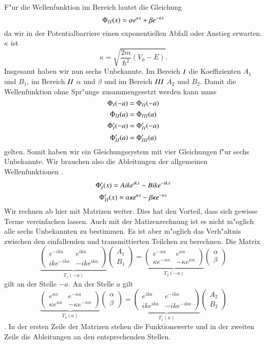 \begin{refsection}
F"ur die Wellenfunktion im Bereich  lautet die Gleichung
\[
\Phi_\RM{2}(x) = \alpha e^{\kappa x} + \beta e^{-\kappa x}
\]
da wir in der Potentialbarriere einen exponentiellen Abfall oder Anstieg erwarten. $\kappa$ ist
\[
\kappa = \sqrt{\frac{2m}{\hbar^2}(V_0 - E)}.
\]
Insgesamt haben wir nun sechs Unbekannte. Im Bereich $\RM{1}$ die Koeffizienten $A_1$ und $B_1$, im Bereich $\RM{2}$ $\alpha$ und $\beta$ und im Bereich $\RM{3}$ $A_2$ und $B_2$. 
Damit die Wellenfunktion ohne Spr"unge zusammengesetzt werden kann muss
\[
\Phi_\RM{1}(-a) = \Phi_\RM{2}(-a)
\]
\[
\Phi_\RM{2}(a) = \Phi_\RM{3}(a)
\]
\[
\Phi_\RM{1}'(-a) = \Phi_\RM{2}'(-a)
\]
\[
\Phi_\RM{2}'(a) = \Phi_\RM{3}'(a)
\]
gelten. Somit haben wir ein Gleichungssystem mit vier Gleichungen f"ur sechs Unbekannte. Wir brauchen also die Ableitungen der allgemeinen Wellenfunktionen .
\[
\Phi_\RM{1}'(x) = Aike^{ikx} - Bike^{-ikx}
\]
\[
\Phi_\RM{2}'(x) = \alpha \kappa e^{\kappa x} - \beta \kappa e^{-\kappa x}
\]
Wir rechnen ab hier mit Matrizen weiter. Dies hat den Vorteil, dass sich gewisse Terme vereinfachen lassen. Auch mit der Matizenrechnung ist es nicht m"oglich alle sechs Unbekannten zu bestimmen. Es ist aber m"oglich das Verh"altnis zwischen den einfallenden und transmittierten Teilchen zu berechnen. Die Matrix 
\[
\underbrace{
\begin{pmatrix}
e^{-ika}
&
e^{ika}
\\
ike^{-ika}
&
-ike^{ika}
\end{pmatrix}
}_{T_1(-a)}
\begin{pmatrix}
A_1
\\
B_1
\end{pmatrix}
 = 
\underbrace{
\begin{pmatrix}
e^{-\kappa a}
&
e^{\kappa a}
\\
\kappa e^{-\kappa a}
&
-\kappa e^{\kappa a}
\end{pmatrix}
}_{T_2(-a)}
\begin{pmatrix}
\alpha
\\
\beta
\end{pmatrix}
\]
gilt an der Stelle $-a$.
An der Stelle $a$ gilt
\[
\underbrace{
\begin{pmatrix}
e^{\kappa a}
&
e^{-\kappa a}
\\
\kappa e^{\kappa a}
&
-\kappa e^{-\kappa a}
\end{pmatrix}
}_{T_2(a)}
\begin{pmatrix}
\alpha
\\
\beta
\end{pmatrix}
 = 
\underbrace{
\begin{pmatrix}
e^{ika}
&
e^{-ika}
\\
ike^{ika}
&
-ike^{-ika}
\end{pmatrix}
}_{T_1(a)}
\begin{pmatrix}
A_2
\\
B_2
\end{pmatrix}
\].
In der ersten Zeile der Matrizen stehen die Funktionswerte und in der zweiten Zeile die Ableitungen an den entsprechenden Stellen.


\end{refsection}

